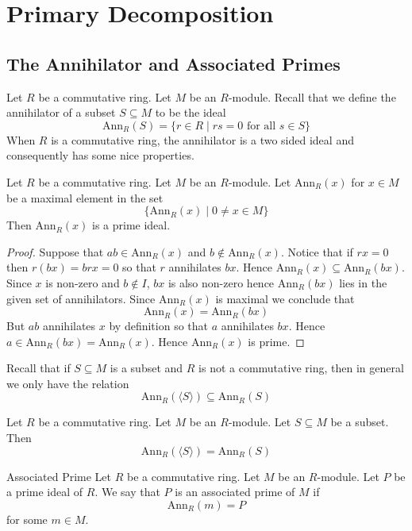 \documentclass[a4paper]{article}
\begin{document}
\pagebreak
\section{Primary Decomposition}
\subsection{The Annihilator and Associated Primes}
Let $R$ be a commutative ring. Let $M$ be an $R$-module. Recall that we define the annihilator of a subset $S\subseteq M$ to be the ideal $$\text{Ann}_R(S)=\{r\in R\;|\;rs=0\text{ for all }s\in S\}$$ When $R$ is a commutative ring, the annihilator is a two sided ideal and consequently has some nice properties. 

\begin{prp}{}{} Let $R$ be a commutative ring. Let $M$ be an $R$-module. Let $\text{Ann}_R(x)$ for $x\in M$ be a maximal element in the set $$\{\text{Ann}_R(x)\;|\;0\neq x\in M\}$$ Then $\text{Ann}_R(x)$ is a prime ideal. 
\begin{proof}
Suppose that $ab\in\text{Ann}_R(x)$ and $b\notin\text{Ann}_R(x)$. Notice that if $rx=0$ then $r(bx)=brx=0$ so that $r$ annihilates $bx$. Hence $\text{Ann}_R(x)\subseteq\text{Ann}_R(bx)$. Since $x$ is non-zero and $b\notin I$, $bx$ is also non-zero hence $\text{Ann}_R(bx)$ lies in the given set of annihilators. Since $\text{Ann}_R(x)$ is maximal we conclude that $$\text{Ann}_R(x)=\text{Ann}_R(bx)$$ But $ab$ annihilates $x$ by definition so that $a$ annihilates $bx$. Hence $a\in\text{Ann}_R(bx)=\text{Ann}_R(x)$. Hence $\text{Ann}_R(x)$ is prime. 
\end{proof}
\end{prp}

Recall that if $S\subseteq M$ is a subset and $R$ is not a commutative ring, then in general we only have the relation $$\text{Ann}_R(\langle S\rangle)\subseteq\text{Ann}_R(S)$$

\begin{prp}{}{} Let $R$ be a commutative ring. Let $M$ be an $R$-module. Let $S\subseteq M$ be a subset. Then $$\text{Ann}_R(\langle S\rangle)=\text{Ann}_R(S)$$
\end{prp}

\begin{defn}{Associated Prime}{} Let $R$ be a commutative ring. Let $M$ be an $R$-module. Let $P$ be a prime ideal of $R$. We say that $P$ is an associated prime of $M$ if $$\text{Ann}_R(m)=P$$ for some $m\in M$. 
\end{defn}
\end{document}
